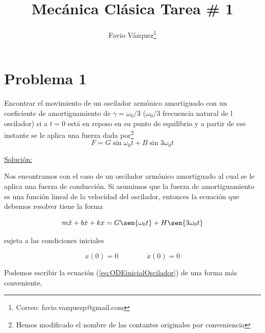 \documentclass[a4paper,10pt]{article}
\title{Mecánica Clásica Tarea \# 1}
\author{Favio Vázquez\thanks{Correo: favio.vazquezp@gmail.com}}\affil{Instituto de Física. Universidad Nacional Autónoma de México}
\date{}
\numberwithin{equation}{section}
\begin{document}
\makeatletter
\def\@maketitle{%
  \newpage
  \null
  \vskip 2em%
  \begin{center}%
  \let \footnote \thanks
    {\Large\bfseries \@title \par}%
    \vskip 1.5em%
    {\normalsize
      \lineskip .5em%
      \begin{tabular}[t]{c}%
        \@author
      \end{tabular}\par}%
    \vskip 1em%
    {\normalsize \@date}%
  \end{center}%
  \par
  \vskip 1.5em}
\makeatother

\maketitle

\section{Problema 1}
Encontrar el movimiento de un oscilador armónico amortiguado
con un coeficiente de amortiguamiento de $\gamma = \omega_{0}/3$ 
($\omega_{0}/3$ frecuencia natural de l oscilador) si a $t=0$ está 
en reposo en su punto de equilibrio y a partir de ese instante se le
aplica una fuerza dada por\footnote{Hemos modificado el nombre de las contantes originales por conveniencia} 
$$F= G\sin{\omega_{0}t}+B\sin{3\omega_{0}t}$$

\underline{Solución:}

\vspace{.3cm}

Nos encontramos con el caso de un oscilador armónico amortiguado al cual se le
aplica una fuerza de conducción. Si asumimos que la fuerza de amortiguamiento es
una función lineal de la velocidad del oscilador, entonces la ecuación que debemos
resolver tiene la forma

\begin{equation}
 m\ddot{x} + b \dot{x} + kx = G \sen{\omega_0 t} + H \sen{3\omega_0 t}
 \label{eq:ODEinicialOscilador}
\end{equation}

sujeta a las condiciones iniciales

\begin{equation}
 x(0) = 0 \qquad \qquad \dot{x}(0) = 0
 \label{eq:condInicialesOscilador}
\end{equation}

Podemos escribir la ecuación (\ref{eq:ODEinicialOscilador}) de una forma más conveniente,
\end{document}
